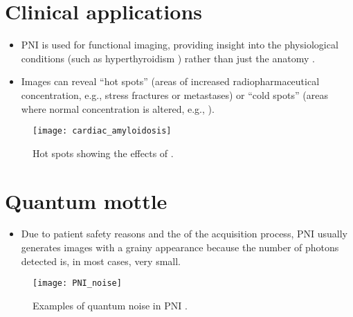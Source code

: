\section{Clinical applications}
\begin{itemize}
\item PNI is used for functional imaging, providing insight into the
  physiological conditions (such as hyperthyroidism
  \cite{abdulla2025molecular_imaging}) rather than just the anatomy
  \cite{bushberg2011essential}.
\item Images can reveal ``hot spots'' (areas of increased
  radiopharmaceutical concentration, e.g., stress fractures or
  metastases) or ``cold spots'' (areas where normal concentration is
  altered, e.g., ).
\end{itemize}
\vspace{-4ex}
\begin{figure}[!b]
  \centering
  \texttt{[image: cardiac\_amyloidosis]}
  \caption{Hot spots showing the effects of 
    \cite{MNT_effects_cardiac_amyloidosis}.\label{fig:hot_spots}}
\end{figure}

\section{Quantum mottle}
\begin{itemize}
\item Due to patient safety reasons and the  of the
  acquisition process, PNI usually generates images with a grainy
  appearance because the number of photons detected is, in most cases,
  very small.
\end{itemize}
\vspace{-4ex}
\begin{figure}[!b]
  \centering
  \texttt{[image: PNI\_noise]}
  \caption{Examples of quantum noise in \gls{PNI}
    \cite{saridin2007quantitative}.}
  \label{PNI_noise}
\end{figure}

